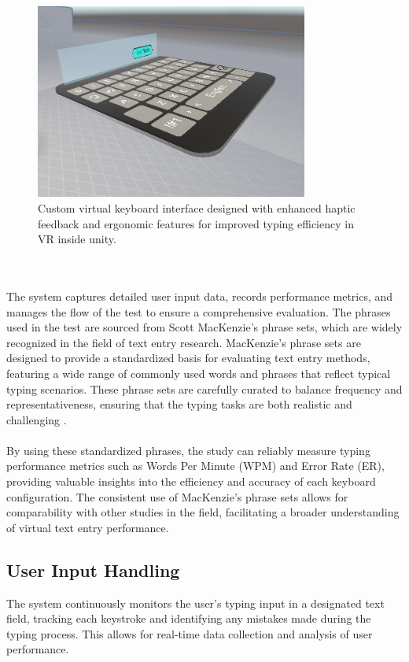 \begin{figure}[h]
    \centering
    \includegraphics[width=0.8\textwidth]{Scenario/Custom_keyboard.PNG} %
    \caption{ \centering Custom virtual keyboard interface designed with enhanced haptic feedback and ergonomic features for improved typing efficiency in VR inside unity.}
    \label{fig:mrtk_keyboard}
\end{figure}\\ \\
The system captures detailed user input data, records performance metrics, and manages the flow of the test to ensure a comprehensive evaluation. The phrases used in the test are sourced from Scott MacKenzie's phrase sets, which are widely recognized in the field of text entry research. MacKenzie's phrase sets are designed to provide a standardized basis for evaluating text entry methods, featuring a wide range of commonly used words and phrases that reflect typical typing scenarios. These phrase sets are carefully curated to balance frequency and representativeness, ensuring that the typing tasks are both realistic and challenging \cite{mackenzie_phrase_set}. \\ \\
By using these standardized phrases, the study can reliably measure typing performance metrics such as Words Per Minute (WPM) and Error Rate (ER), providing valuable insights into the efficiency and accuracy of each keyboard configuration. The consistent use of MacKenzie's phrase sets allows for comparability with other studies in the field, facilitating a broader understanding of virtual text entry performance. 
\subsection{User Input Handling}
The system continuously monitors the user's typing input in a designated text field, tracking each keystroke and identifying any mistakes made during the typing process. This allows for real-time data collection and analysis of user performance.

